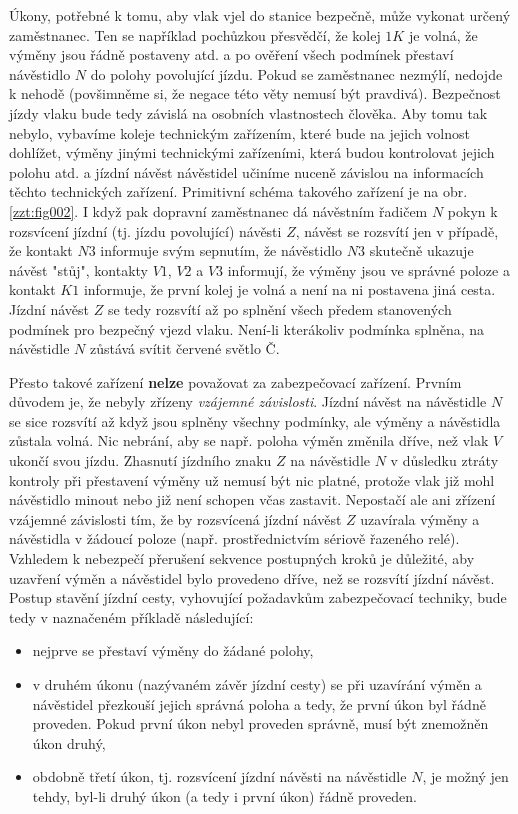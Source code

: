 {  Úkony, potřebné k tomu, aby vlak vjel do stanice bezpečně, může vykonat určený zaměstnanec. Ten
  se například pochůzkou přesvědčí, že kolej \(1K\) je volná, že výměny jsou řádně postaveny atd. a 
  po ověření všech podmínek přestaví návěstidlo \(N\) do polohy povolující jízdu. Pokud se 
  zaměstnanec nezmýlí, nedojde k nehodě (povšimněme si, že negace této věty nemusí být pravdivá). 
  Bezpečnost jízdy vlaku bude tedy závislá na osobních vlastnostech člověka. Aby tomu tak nebylo, 
  vybavíme koleje technickým zařízením, které bude na jejich volnost dohlížet, výměny jinými
  technickými zařízeními, která budou kontrolovat jejich polohu atd. a jízdní návěst návěstidel
  učiníme nuceně závislou na informacích těchto technických zařízení. Primitivní schéma
  takového zařízení je na obr. \ref{zzt:fig002}. I když pak dopravní zaměstnanec dá návěstním 
  řadičem \(N\) pokyn k rozsvícení jízdní (tj. jízdu povolující) návěsti \(Z\), návěst se rozsvítí 
  jen v případě, že kontakt \(N3\) informuje svým sepnutím, že návěstidlo \(N3\) skutečně ukazuje 
  návěst "stůj", kontakty \(V1\), \(V2\) a \(V3\) informují, že výměny jsou ve správné poloze a 
  kontakt \(K1\) informuje, že první kolej je volná a není na ni postavena jiná cesta. Jízdní 
  návěst \(Z\) se tedy rozsvítí až po splnění všech předem stanovených podmínek pro bezpečný vjezd 
  vlaku. Není-li kterákoliv podmínka splněna, na návěstidle \(N\) zůstává svítit červené světlo Č. 
  
  Přesto takové zařízení \textbf{nelze} považovat za zabezpečovací zařízení. Prvním důvodem je, že 
  nebyly zřízeny \emph{vzájemné závislosti}. Jízdní návěst na návěstidle \(N\) se sice rozsvítí až 
  když jsou splněny všechny podmínky, ale výměny a návěstidla zůstala volná. Nic nebrání, aby se 
  např. poloha výměn změnila dříve, než vlak \(V\) ukončí svou jízdu. Zhasnutí jízdního znaku \(Z\) 
  na návěstidle \(N\) v důsledku ztráty kontroly při přestavení výměny už nemusí být nic platné, 
  protože vlak již mohl návěstidlo minout nebo již není schopen včas zastavit. Nepostačí ale ani 
  zřízení vzájemné závislosti tím, že by rozsvícená jízdní návěst \(Z\) uzavírala výměny a 
  návěstidla v žádoucí poloze (např. prostřednictvím sériově řazeného relé). Vzhledem k nebezpečí
  přerušení sekvence postupných kroků je důležité, aby uzavření výměn a návěstidel bylo provedeno 
  dříve, než se rozsvítí jízdní návěst. Postup stavění jízdní cesty, vyhovující požadavkům 
  zabezpečovací techniky, bude tedy v naznačeném příkladě následující:
  \begin{itemize}[noitemsep]
    \item nejprve se přestaví výměny do žádané polohy,
    \item v druhém úkonu (nazývaném závěr jízdní cesty) se při uzavírání výměn a návěstidel 
          přezkouší jejich správná poloha a tedy, že první úkon byl řádně proveden. Pokud první 
          úkon nebyl proveden správně, musí být znemožněn úkon druhý,
    \item obdobně třetí úkon, tj. rozsvícení jízdní návěsti na návěstidle \(N\), je možný jen 
          tehdy, byl-li druhý úkon (a tedy i první úkon) řádně proveden. 
  \end{itemize}
  
}
